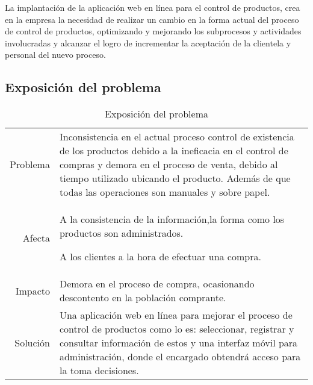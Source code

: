 \documentclass[a4paper,11pt, spanish]{report}
\begin{document}
La implantación de la aplicación web en línea para el control de productos, crea en la empresa la necesidad de realizar un cambio	en la forma   actual del proceso de control de productos, optimizando y mejorando los subprocesos y actividades involucradas y alcanzar el logro de incrementar la aceptación de la clientela y personal del nuevo proceso.

      \subsection{Exposición del problema}
      {\renewcommand{\arraystretch}{1.5}%
      \noindent\begin{table}[H]
      \noindent\begin{tabularx}{\textwidth}{r|X}
        Problema & Inconsistencia en el actual proceso control de existencia de los productos debido a la ineficacia en el control de compras y demora en el proceso de venta, debido al tiempo utilizado ubicando el producto. Además de que todas las operaciones son manuales y sobre papel.\\
        Afecta & A la consistencia de la información,la forma como los productos son
administrados.

A los clientes a la hora de efectuar una compra. \\
        Impacto & Demora en el proceso de compra, ocasionando descontento en la población
comprante. \\
        Solución & Una aplicación web en línea para mejorar el proceso de control de productos
como lo es: seleccionar, registrar y consultar información de estos y una interfaz móvil para administración, donde el encargado obtendrá acceso
para la toma decisiones.\\
      \end{tabularx}
      \caption{Exposición del problema}
      \end{table}

}
\end{document}
